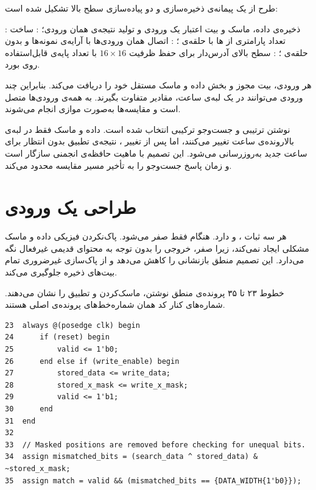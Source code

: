 طرح از یک پیمانه‌ی ذخیره‌سازی و دو پیاده‌سازی سطح بالا تشکیل شده است:

 : ذخیره‌ی داده، ماسک و بیت اعتبار یک ورودی و تولید نتیجه‌ی همان ورودی؛
 : ساخت تعداد پارامتری از ها با حلقه‌ی ؛
 : اتصال همان ورودی‌ها با آرایه‌ی نمونه‌ها و بدون حلقه‌ی ؛
 : سطح بالای آدرس‌دار برای حفظ ظرفیت $16\times16$ با تعداد پایه‌ی قابل‌استفاده روی بورد.

هر ورودی، بیت مجوز و بخش داده و ماسک مستقل خود را دریافت می‌کند. بنابراین چند ورودی
می‌توانند در یک لبه‌ی ساعت، مقادیر متفاوت بگیرند.  به همه‌ی ورودی‌ها
متصل است و مقایسه‌ها به‌صورت موازی انجام می‌شوند.

نوشتن ترتیبی و جست‌وجو ترکیبی انتخاب شده است. داده و ماسک فقط در لبه‌ی بالارونده‌ی ساعت
تغییر می‌کنند، اما پس از تغییر ، نتیجه‌ی تطبیق بدون انتظار برای ساعت جدید
به‌روزرسانی می‌شود. این تصمیم با ماهیت حافظه‌ی انجمنی سازگار است و زمان پاسخ جست‌وجو را به
تأخیر مسیر مقایسه محدود می‌کند.

\section{طراحی یک ورودی }

هر  سه ثبات ،  و
 دارد. هنگام  فقط  صفر می‌شود. پاک‌نکردن فیزیکی داده و
ماسک مشکلی ایجاد نمی‌کند، زیرا  صفر، خروجی  را بدون توجه به محتوای
قدیمی غیرفعال نگه می‌دارد. این تصمیم منطق بازنشانی را کاهش می‌دهد و از پاک‌سازی غیرضروری
تمام بیت‌های ذخیره جلوگیری می‌کند.

خطوط ۲۳ تا ۳۵ پرونده‌ی  منطق نوشتن، ماسک‌کردن و تطبیق را نشان می‌دهند.
شماره‌های کنار کد همان شماره‌خط‌های پرونده‌ی اصلی هستند.

\begin{dsdlcodeblock}
\begin{verbatim}
23  always @(posedge clk) begin
24      if (reset) begin
25          valid <= 1'b0;
26      end else if (write_enable) begin
27          stored_data <= write_data;
28          stored_x_mask <= write_x_mask;
29          valid <= 1'b1;
30      end
31  end
32
33  // Masked positions are removed before checking for unequal bits.
34  assign mismatched_bits = (search_data ^ stored_data) & ~stored_x_mask;
35  assign match = valid && (mismatched_bits == {DATA_WIDTH{1'b0}});
\end{verbatim}
\end{dsdlcodeblock}


